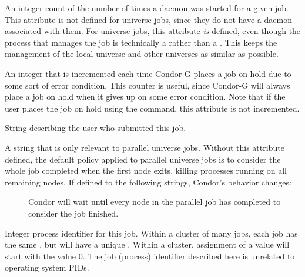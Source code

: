 \begin{description}
\item[\AdAttr{NumShadowStarts}:]  An integer count of the number of
  times a  daemon was started for a given job.
  This attribute is not defined for
   universe jobs, since
  they do not have a  daemon associated with them.
  For  universe jobs, this attribute \emph{is}
  defined, even though the process that manages the job is technically
  a  rather than a .  
  This keeps the management of the
  local universe and other universes as similar as possible.

\item[\AdAttr{NumSystemHolds}:]   An integer that is incremented each time
Condor-G places a job on hold due to some sort of error condition.  This
counter is useful, since Condor-G will always place a job on hold when it
gives up on some error condition.  Note that if the user places the job
on hold using the  command, this attribute is not incremented.

\item[\AdAttr{Owner}:]  String describing the user who submitted this
job.

\item[\AdAttr{ParallelShutdownPolicy}:]  A string that is only relevant
to parallel universe jobs.  Without this attribute defined, the default
policy applied to parallel universe jobs is to consider the whole job
completed when the first node exits, killing processes running on
all remaining nodes.  If defined to the following strings, Condor's
behavior changes:
  \begin{description}
  \item[] Condor will wait until every node in 
  the parallel job has completed to consider the job finished.
  \end{description}


\item[\AdAttr{ProcId}:]  Integer process identifier for this job.
Within a cluster of many jobs,
each job has the same , but will have a unique .
Within a cluster, assignment of a  value will start
with the value 0.
The job (process) identifier described here is unrelated to operating
system PIDs.



\end{description}

